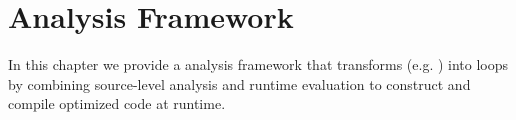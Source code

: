 \chapter{Analysis Framework}
In this chapter we provide a \javascript analysis framework that transforms \pipelines (e.g. ) into  loops by combining source-level analysis and runtime evaluation to construct and compile optimized code at runtime.  






